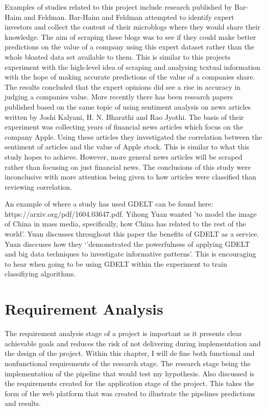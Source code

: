 \documentclass[a4paper,11pt]{report}
\begin{document}
Examples of studies related to this project include research published by Bar-Haim and Feldman.  Bar-Haim and Feldman attempted to identify expert investors and collect the content of their microblogs where they would share their knowledge. The aim of scraping these blogs was to see if they could make better predictions on the value of a company using this expert dataset rather than the whole bloated data set available to them. This is similar to this projects experiment with the high-level idea of scraping and analysing textual information with the hope of making accurate predictions of the value of a companies share.  The results concluded that the expert opinions did see a rise in accuracy in judging a companies value. More recently there has been research papers published based on the same topic of using sentiment analysis on news articles written by Joshi Kalyani, H. N. Bharathi and Rao Jyothi.  The basis of their experiment was collecting years of financial news articles which focus on the company Apple. Using these articles they investigated the correlation between the sentiment of articles and the value of Apple stock.  This is similar to what this study hopes to achieve. However, more general news articles will be scraped rather than focusing on just financial news. The conclusions of this study were inconclusive with more attention being given to how articles were classified than reviewing correlation.

An example of where a study has used GDELT can be found here: https://arxiv.org/pdf/1604.03647.pdf. Yihong Yuan wanted 'to model the image of China in mass media, specifically, how China has related to the rest of the world'. Yuan discusses throughout this paper the benefits of GDELT as a service. Yuan disccuses how they `'demonstrated the powerfulness of applying GDELT and big data techniques to investigate informative patterns'. This is encouraging to hear when going to be using GDELT within the experiment to train classifiying algorithms.


\chapter{Requirement Analysis}
\label{chap:requirement-anal}

The requirement analysis stage of a project is important as it presents clear achievable goals and reduces the risk of not delivering during implementation and the design of the project. Within this chapter, I will define both functional and nonfunctional requirements of the research stage. The research stage being the implementation of the pipeline that would test my hypothesis. Also discussed is the requirements created for the application stage of the project. This takes the form of the web platform that was created to illustrate the pipelines predictions and results.
\end{document}
